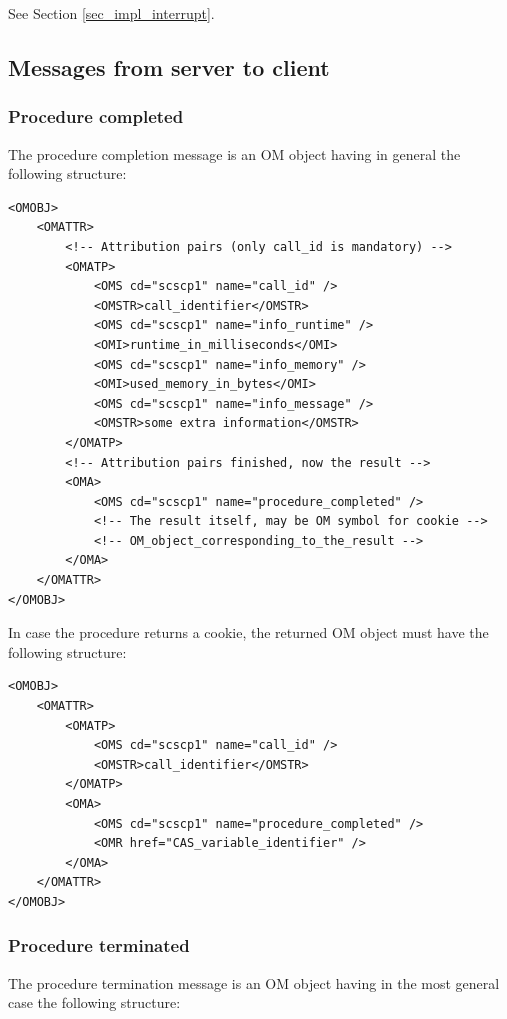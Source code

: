\documentclass{amsart}
\begin{document}
See Section \ref{sec_impl_interrupt}.

\subsection{Messages from server to client}

\subsubsection{Procedure completed}

The procedure completion message is an OM object having in general 
the following structure:

\begin{verbatim}
<OMOBJ>
    <OMATTR>
        <!-- Attribution pairs (only call_id is mandatory) -->
        <OMATP>
            <OMS cd="scscp1" name="call_id" />
            <OMSTR>call_identifier</OMSTR>
            <OMS cd="scscp1" name="info_runtime" />
            <OMI>runtime_in_milliseconds</OMI>
            <OMS cd="scscp1" name="info_memory" />
            <OMI>used_memory_in_bytes</OMI>
            <OMS cd="scscp1" name="info_message" />
            <OMSTR>some extra information</OMSTR>
        </OMATP>    
        <!-- Attribution pairs finished, now the result -->
        <OMA>
            <OMS cd="scscp1" name="procedure_completed" />
            <!-- The result itself, may be OM symbol for cookie -->
            <!-- OM_object_corresponding_to_the_result -->
        </OMA>
    </OMATTR>
</OMOBJ>
\end{verbatim}


In case the procedure returns a cookie, the returned OM object must
have the following structure:

\begin{verbatim}
<OMOBJ>
    <OMATTR>
        <OMATP>
            <OMS cd="scscp1" name="call_id" />
            <OMSTR>call_identifier</OMSTR>
        </OMATP>
        <OMA> 
            <OMS cd="scscp1" name="procedure_completed" />
            <OMR href="CAS_variable_identifier" />
        </OMA>
    </OMATTR>
</OMOBJ>
\end{verbatim}

\subsubsection{Procedure terminated}

The procedure termination message is an OM object having 
in the most general case the following structure:
\end{document}
